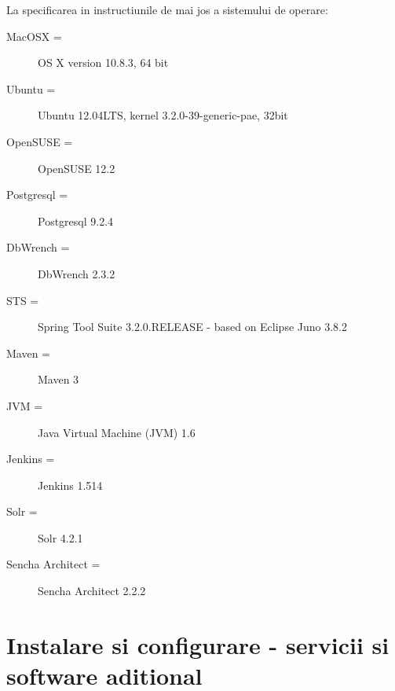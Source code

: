 La specificarea in instructiunile de mai jos a sistemului de operare:
\begin{description} 
\item [MacOSX =] OS X version 10.8.3, 64 bit
\item [Ubuntu =] Ubuntu 12.04LTS, kernel 3.2.0-39-generic-pae, 32bit
\item [OpenSUSE = ] OpenSUSE 12.2
\item [Postgresql =] Postgresql 9.2.4
\item [DbWrench =] DbWrench 2.3.2
\item [STS =] Spring Tool Suite 3.2.0.RELEASE - based on Eclipse Juno 3.8.2
\item [Maven =] Maven 3
\item [JVM =] Java Virtual Machine (JVM) 1.6
\item [Jenkins =] Jenkins 1.514
\item [Solr =] Solr 4.2.1
\item [Sencha Architect =] Sencha Architect 2.2.2
\end{description}

\section{Instalare si configurare - servicii si software aditional}

